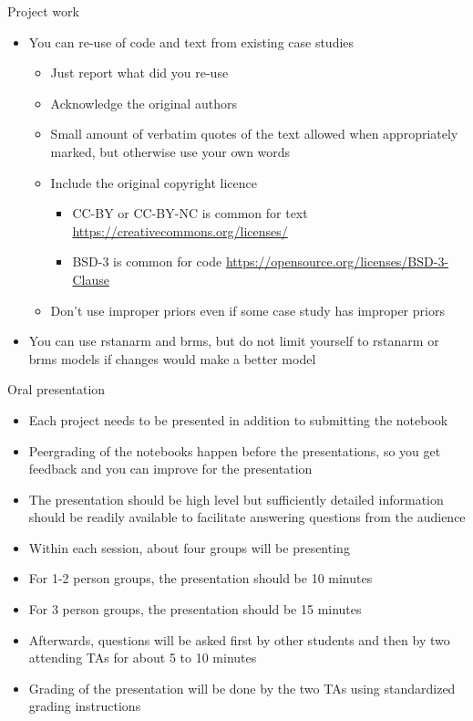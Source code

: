 \documentclass[t]{beamer}
\begin{document}
\begin{frame}
  
  {\Large\color{navyblue} Project work}
  
  \begin{itemize}
  \item You can re-use of code and text from existing case studies
    \begin{itemize}
    \item Just report what did you re-use
    \item Acknowledge the original authors
    \item Small amount of verbatim quotes of the text allowed when
      appropriately marked, but otherwise use your own words
    \item Include the original copyright licence
      \begin{itemize}
      \item CC-BY or CC-BY-NC is common for text
        \url{https://creativecommons.org/licenses/}
      \item BSD-3 is common for code
        \url{https://opensource.org/licenses/BSD-3-Clause}
      \end{itemize}
    \item Don't use improper priors even if some case study has improper priors
  \end{itemize}
  \item You can use rstanarm and brms, but do not limit yourself
    to rstanarm or brms models if changes would make a better model
  \end{itemize}
\end{frame}

\begin{frame}
  
  {\Large\color{navyblue} Oral presentation}
  
  \begin{itemize}
  \item Each project needs to be presented in addition to submitting the notebook 
  \item Peergrading of the notebooks happen before the presentations,
    so you get feedback and you can improve for the presentation
  \item The presentation should be high level but sufficiently detailed information should be readily available to facilitate answering questions from the audience
  \item Within each session, about four groups will be presenting
  \item For 1-2 person groups, the presentation should be 10 minutes
  \item For 3 person groups, the presentation should be 15 minutes 
  \item Afterwards, questions will be asked first by other students and then by two attending TAs for about 5 to 10 minutes
  \item Grading of the presentation will be done by the two TAs using standardized grading instructions
  \end{itemize}
\end{frame}
\end{document}
